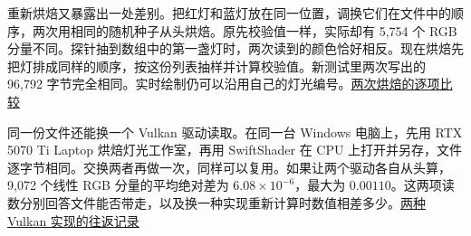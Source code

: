 重新烘焙又暴露出一处差别。把红灯和蓝灯放在同一位置，调换它们在文件中的顺序，两次用相同的随机种子从头烘焙。原先校验值一样，实际却有 5,754 个 RGB 分量不同。探针抽到数组中的第一盏灯时，两次读到的颜色恰好相反。现在烘焙先把灯排成同样的顺序，按这份列表抽样并计算校验值。新测试里两次写出的 96,792 字节完全相同。实时绘制仍可以沿用自己的灯光编号。\href{run:../validation/directional/bake-order.csv}{两次烘焙的逐项比较}

同一份文件还能换一个 Vulkan 驱动读取。在同一台 Windows 电脑上，先用 RTX 5070 Ti Laptop 烘焙灯光工作室，再用 SwiftShader 在 CPU 上打开并另存，文件逐字节相同。交换两者再做一次，同样可以复用。如果让两个驱动各自从头算，9,072 个线性 RGB 分量的平均绝对差为 $6.08\times10^{-6}$，最大为 $0.00110$。这两项读数分别回答文件能否带走，以及换一种实现重新计算时数值相差多少。\href{run:../validation/probe-drivers.json}{两种 Vulkan 实现的往返记录}
